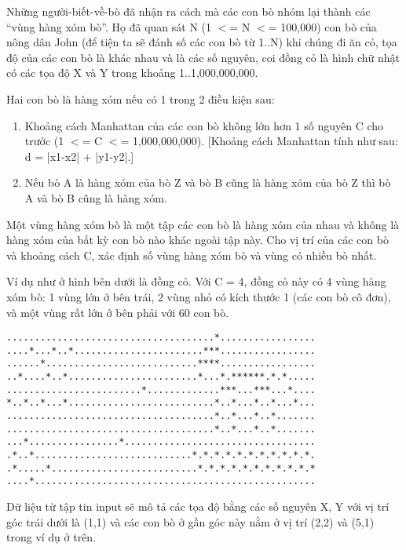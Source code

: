 



   Những người-biết-về-bò đã nhận ra cách mà các con bò nhóm lại thành  các “vùng hàng xóm bò”. Họ đã quan sát N (1 $<$= N $<$= 100,000) con bò của  nông dân John (để tiện ta sẽ đánh số các con bò từ 1..N) khi chúng  đi ăn cỏ, tọa độ của các con bò là khác nhau và là các số nguyên,  coi đồng cỏ là hình chữ nhật có các tọa độ X và Y trong  khoảng 1..1,000,000,000.  

   Hai con bò là hàng xóm nếu có 1 trong 2 điều kiện sau:  
\begin{enumerate}
	\item     Khoảng cách Manhattan của các con bò không lớn hơn 1 số nguyên       C cho trước (1 $<$= C $<$= 1,000,000,000). [Khoảng cách Manhattan      tính như sau: d = |x1-x2| + |y1-y2|.]   
	\item     Nếu bò A là hàng xóm của bò Z và bò B cũng là hàng xóm của bò Z       thì bò A và bò B cũng là hàng xóm.   
\end{enumerate}

   Một vùng hàng xóm bò là một tập các con bò là hàng xóm của nhau  và không là hàng xóm của bất kỳ con bò nào khác ngoài tập này. Cho vị trí của các con bò và khoảng cách C, xác định số vùng hàng  xóm bò và vùng có nhiều bò nhất.  

   Ví dụ như ở hình bên dưới là đồng cỏ. Với C = 4, đồng cỏ này có  4 vùng hàng xóm bò: 1 vùng lớn ở bên trái, 2 vùng nhỏ có  kích thước 1 (các con bò cô đơn), và một vùng rất lớn ở bên  phải với 60 con bò.  
\begin{verbatim}
.....................................*.................
....*...*..*.......................***.................
......*...........................****.................
..*....*..*.......................*...*.******.*.*.....
........................*.............***...***...*....
*..*..*...*..........................*..*...*..*...*...
.....................................*..*...*..*.......
.....................................*..*...*..*.......
...*................*..................................
.*..*............................*.*.*.*.*.*.*.*.*.*.*.
.*.....*..........................*.*.*.*.*.*.*.*.*.*.*
....*..................................................
\end{verbatim}

   Dữ liệu từ tập tin input sẽ mô tả các tọa độ bằng các số  nguyên X, Y với vị trí góc trái dưới là (1,1) và các con bò  ở gần góc này nằm ở vị trí (2,2) và (5,1) trong ví dụ ở trên.  

